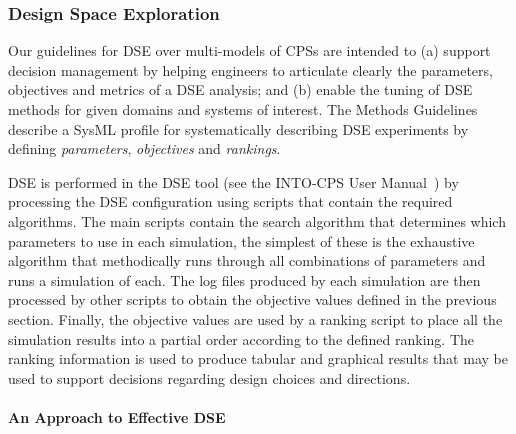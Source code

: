 \subsubsection{Design Space Exploration}
\label{sec:method:dse}

Our guidelines for DSE over multi-models of CPSs are intended to (a) support decision management by helping engineers to articulate clearly the parameters, objectives and metrics of a DSE analysis; and (b) enable the tuning of DSE methods for given domains and systems of interest. The Methods Guidelines~\cite{Pierce&18} describe a SysML profile for systematically describing DSE experiments by defining \emph{parameters}, \emph{objectives} and \emph{rankings}.

DSE is performed in the DSE tool (see the INTO-CPS User Manual~\cite{Larsen&18a}) by processing the DSE configuration using scripts that contain the required algorithms.  The main scripts contain the search algorithm that determines which parameters to use in each simulation, the simplest of these is the exhaustive algorithm that methodically runs through all combinations of parameters and runs a simulation of each.  The log files produced by each simulation are then processed by other scripts to obtain the objective values defined in the previous section.  Finally, the objective values are used by a ranking script to place all the simulation results into a partial order according to the defined ranking.  The ranking information is used to produce tabular and graphical results that may be used to support decisions regarding design choices and directions.

%

\paragraph{An Approach to Effective DSE}
\label{sec:dse-algorithms}


